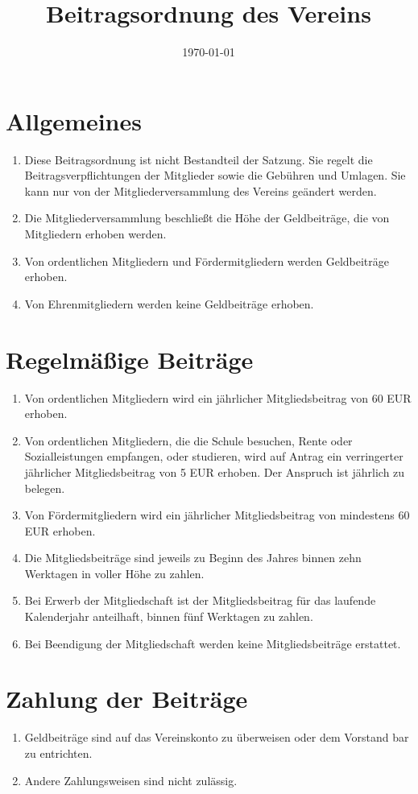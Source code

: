 \documentclass[12pt,a4paper,draft]{article}
\title{Beitragsordnung des Vereins \unsername}
\author{\unsername}
\date{\today}
\begin{document}
\maketitle
\tableofcontents

\section{Allgemeines}
\begin{enumerate}
\item Diese Beitragsordnung ist nicht Bestandteil der Satzung. Sie regelt die 
Beitragsverpflichtungen der Mitglieder sowie die Gebühren und Umlagen. Sie kann 
nur von der Mitgliederversammlung des Vereins geändert werden.

\item Die Mitgliederversammlung beschließt die Höhe der Geldbeiträge, die von 
Mitgliedern erhoben werden.

\item Von ordentlichen Mitgliedern und Fördermitgliedern werden Geldbeiträge 
erhoben.

\item Von Ehrenmitgliedern werden keine Geldbeiträge erhoben.
\end{enumerate}

\section{Regelmäßige Beiträge}
\begin{enumerate}
\item Von ordentlichen Mitgliedern wird ein jährlicher Mitgliedsbeitrag von 60 
EUR erhoben.

\item Von ordentlichen Mitgliedern, die die Schule besuchen, Rente oder 
Sozialleistungen empfangen, oder studieren, wird auf Antrag ein verringerter 
jährlicher Mitgliedsbeitrag von 5 EUR erhoben. Der Anspruch ist jährlich zu 
belegen.

\item Von Fördermitgliedern wird ein jährlicher Mitgliedsbeitrag von mindestens 
60 EUR erhoben.

\item Die Mitgliedsbeiträge sind jeweils zu Beginn des Jahres binnen zehn 
Werktagen in voller Höhe zu zahlen.

\item Bei Erwerb der Mitgliedschaft ist der Mitgliedsbeitrag für das laufende 
Kalenderjahr anteilhaft, binnen fünf Werktagen zu zahlen.

\item Bei Beendigung der Mitgliedschaft werden keine Mitgliedsbeiträge 
erstattet.
\end{enumerate}

\section{Zahlung der Beiträge}
\begin{enumerate}
\item Geldbeiträge sind auf das Vereinskonto zu überweisen oder dem Vorstand 
bar zu entrichten.

\item Andere Zahlungsweisen sind nicht zulässig.
\end{enumerate}
\end{document}
